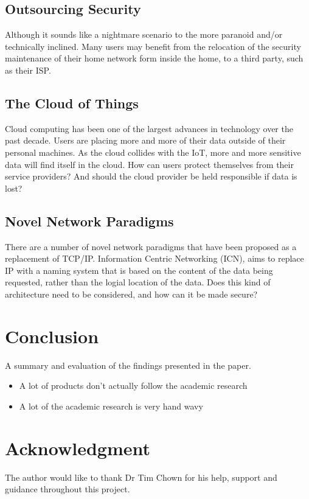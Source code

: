 \documentclass[10pt,journal,compsoc]{IEEEtran}
\begin{document}
\subsection{Outsourcing Security}
Although it sounds like a nightmare scenario to the more paranoid and/or
technically inclined. Many users may benefit from the relocation of the
security maintenance of their home network form inside the home, to a third
party, such as their ISP. 

\subsection{The Cloud of Things}
Cloud computing has been one of the largest advances in technology over the
past decade. Users are placing more and more of their data outside of their
personal machines. As the cloud collides with the IoT, more and more sensitive
data will find itself in the cloud. How can users protect themselves from their
service providers? And should the cloud provider be held responsible if data is
lost?

\subsection{Novel Network Paradigms}
There are a number of novel network paradigms that have been proposed as a
replacement of TCP/IP. Information Centric Networking (ICN), aims to replace IP
with a naming system that is based on the content of the data being requested,
rather than the logial location of the data. Does this kind of architecture
need to be considered, and how can it be made secure?


\section{Conclusion}
A summary and evaluation of the findings presented in the paper.

\begin{itemize}
\item A lot of products don't actually follow the academic research
\item A lot of the academic research is very hand wavy
\end{itemize}



\section*{Acknowledgment}
The author would like to thank Dr Tim Chown for his help, support and guidance
throughout this project. 
\end{document}
